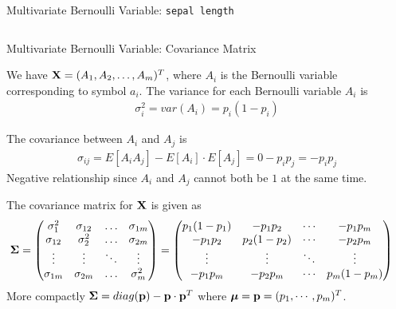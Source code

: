 \begin{frame}{Multivariate Bernoulli Variable: {\tt sepal length}}
\begin{columns}
\end{columns}
\end{frame}


\begin{frame}{Multivariate Bernoulli Variable: Covariance Matrix}
  \small

  We have
$\mathbf{X} = (A_1, A_2, \dots, A_m)^T$, where $A_i$ is the
Bernoulli variable corresponding to symbol $a_i$. 
The variance for 
each Bernoulli variable $A_i$ is
\begin{align*}
    \sigma_i^2 = var(A_i) = p_i(1-p_i)
\end{align*}

The covariance between $A_i$ and $A_{j}$ is
\begin{align*}
    \sigma_{ij} = E[A_i A_{j}] - E[A_i]\cdot E[A_{j}] = 0 - p_i p_{j}
    = -p_i p_{j}
\end{align*}
Negative relationship since
$A_i$ and $A_{j}$ cannot both be $1$ at the same time.

The covariance matrix for $\mathbf{X}$ is given as
\begin{align*}
    \cov =
    \matr{
        \sigma_1^2 & \sigma_{12} & \dots & \sigma_{1m}\\
        \sigma_{12} & \sigma_{2}^2 & \dots & \sigma_{2m}\\
        \vdots & \vdots & \ddots & \vdots\\
        \sigma_{1m} & \sigma_{2m} & \dots & \sigma_{m}^2\\
    }
    & =
    \amatr{c}{p_1(1-p_1) & -p_1p_2 & \cdots & -p_1p_m\\
    -p_1p_2 & p_2(1-p_2) & \cdots & -p_2p_m\\
    \vdots & \vdots & \ddots & \vdots\\
    -p_1p_m & -p_2p_m & \cdots & p_m(1-p_m)\\
    }
\end{align*}
More compactly ${\bm \Sigma} =diag(\mathbf{p}) - \mathbf{p} \cdot \mathbf{p}^T$
where ${\bm \mu} = \mathbf{p} = (p_1, \cdots, p_m)^T$.
\end{frame}


